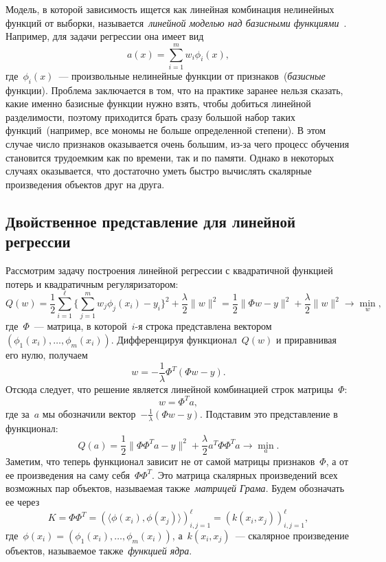 \documentclass[12pt,fleqn]{article}
\begin{document}
Модель, в которой зависимость ищется как линейная комбинация
нелинейных функций от выборки, называется~\emph{линейной моделью над
базисными функциями}~\cite{bishop06prml}.
Например, для задачи регрессии она имеет вид
\[
    a(x) = \sum_{i = 1}^{m} w_i \phi_i(x),
\]
где~$\phi_i(x)$~--- произвольные нелинейные функции от
признаков~(\emph{базисные} функции).
Проблема заключается в том, что на практике
заранее нельзя сказать, какие именно базисные функции
нужно взять, чтобы добиться линейной разделимости, поэтому приходится
брать сразу большой набор таких функций~(например, все мономы не больше определенной
степени).
В этом случае число признаков оказывается очень большим,
из-за чего процесс обучения становится трудоемким как по времени, так и по памяти.
Однако в некоторых случаях оказывается, что достаточно уметь быстро
вычислять скалярные произведения объектов друг на друга.

\subsection{Двойственное представление для линейной регрессии}
Рассмотрим задачу построения линейной регрессии с квадратичной
функцией потерь и квадратичным регуляризатором:
\[
    Q(w)
    =
    \frac{1}{2} \sum_{i = 1}^{\ell} \Biggl\{
        \sum_{j = 1}^{m} w_j \phi_j(x_{i}) - y_i
    \Biggr\}^2
    +
    \frac{\lambda}{2} \|w\|^2
    =
    \frac{1}{2} \| \Phi w - y \|^2 + \frac{\lambda}{2} \|w\|^2 \to \min_w,
\]
где~$\Phi$~--- матрица, в которой~$i$-я строка представлена
вектором~$(\phi_1(x_i), \dots, \phi_m(x_i))$.
Дифференцируя функционал~$Q(w)$ и приравнивая его нулю,
получаем
\[
    w = - \frac{1}{\lambda}
        \Phi^T (\Phi w - y).
\]
Отсюда следует, что решение является линейной комбинацией
строк матрицы~$\Phi$:
\[
    w = \Phi^T a,
\]
где за~$a$ мы обозначили вектор~$-\frac{1}{\lambda} (\Phi w - y)$.
Подставим это представление в функционал:
\[
    Q(a)
    =
    \frac{1}{2} \| \Phi \Phi^T a - y \|^2 + \frac{\lambda}{2} a^T \Phi \Phi^T a \to \min_a.
\]
Заметим, что теперь функционал зависит не от самой матрицы признаков~$\Phi$,
а от ее произведения на саму себя~$\Phi \Phi^T$.
Это матрица скалярных произведений всех возможных пар объектов,
называемая также~\emph{матрицей Грама}.
Будем обозначать ее через
\[
    K = \Phi \Phi^T =
    (\langle \phi(x_i), \phi(x_j) \rangle)_{i, j = 1}^{\ell}
    =
    (k(x_i, x_j))_{i, j = 1}^{\ell},
\]
где~$\phi(x_i) = (\phi_1(x_i), \dots, \phi_m(x_i))$,
а~$k(x_i, x_j)$~--- скалярное произведение объектов,
называемое также~\emph{функцией ядра}.
\end{document}
